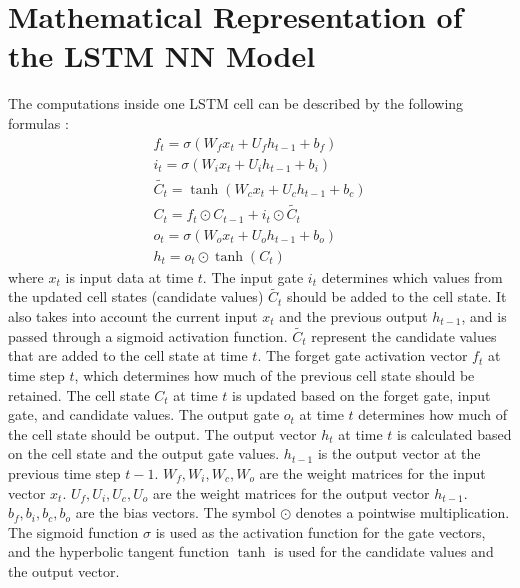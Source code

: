 \section{Mathematical Representation of the LSTM NN Model}
\label{bilstm_appendix}
The computations inside one LSTM cell can be described by the following formulas \citep{ihianle_2020}:
\begin{subequations}
    \begin{gather}
        f_t = \sigma(W_f x_t + U_f h_{t-1} + b_f)\\ 
        i_t = \sigma(W_i x_t + U_i h_{t-1} + b_i)\\ 
        \tilde{C_t} = \tanh(W_c x_t + U_c h_{t-1} + b_c)\\
        C_t = f_t \odot C_{t-1} + i_t \odot \tilde{C_t}\\
        o_t = \sigma(W_o x_t + U_o h_{t-1} + b_o)\\
        h_t = o_t \odot \tanh(C_t)
    \end{gather}
    \label{eq_lstm}
\end{subequations}
where $x_t$ is input data at time $t$. The input gate $i_t$ determines which values from the updated cell states (candidate values) $\tilde{C_t}$ should be added to the cell state. It also takes into account the current input $x_t$ and the previous output $h_{t-1}$, and is passed through a sigmoid activation function. 
$\tilde{C_t}$ represent the candidate values that are added to the cell state at time $t$. 
The forget gate activation vector $f_t$ at time step $t$, which determines how much of the previous cell state should be retained. 
The cell state $C_t$ at time $t$ is updated based on the forget gate, input gate, and candidate values. 
The output gate $o_t$ at time $t$ determines how much of the cell state should be output. 
The output vector $h_t$ at time $t$ is calculated based on the cell state and the output gate values.
$h_{t-1}$ is the output vector at the previous time step $t-1$. 
$W_f, W_i, W_c, W_o$ are the weight matrices for the input vector $x_t$. 
$U_f, U_i, U_c, U_o$ are the weight matrices for the output vector $h_{t-1}$.
$b_f, b_i, b_c, b_o$ are the bias vectors. 
The symbol $\odot$ denotes a pointwise multiplication. 
The sigmoid function $\sigma$ is used as the activation function for the gate vectors, and the hyperbolic tangent function $\tanh$ is used for the candidate values and the output vector.
